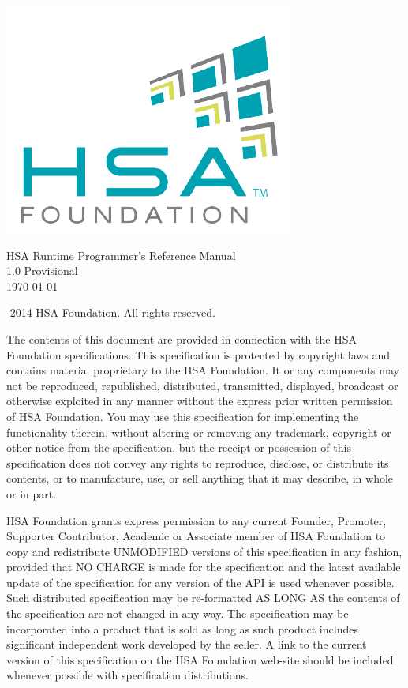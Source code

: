 \documentclass[final]{book}
\newcommand{\doctitle}{HSA Runtime Programmer's Reference Manual}
\newcommand{\docversion}{1.0 Provisional}
\begin{document}

\begin{titlepage}
\includegraphics[width=.4\textwidth]{fig/foundation_small.png}
\vspace*{7cm}
\begin{center}
{\Large \doctitle\\[1ex]\large\docversion}\\
\vspace*{1cm}
\vspace*{0.5cm}
{\small \today}
\end{center}
\end{titlepage}
\thispagestyle{empty} {-2014 HSA Foundation. All rights
  reserved.}


The contents of this document are provided in connection with the HSA Foundation
specifications. This specification is protected by copyright laws and contains
material proprietary to the HSA Foundation. It or any components may not be
reproduced, republished, distributed, transmitted, displayed, broadcast or
otherwise exploited in any manner without the express prior written permission
of HSA Foundation. You may use this specification for implementing the
functionality therein, without altering or removing any trademark, copyright or
other notice from the specification, but the receipt or possession of this
specification does not convey any rights to reproduce, disclose, or distribute
its contents, or to manufacture, use, or sell anything that it may describe, in
whole or in part.

HSA Foundation grants express permission to any current Founder, Promoter,
Supporter Contributor, Academic or Associate member of HSA Foundation to copy
and redistribute UNMODIFIED versions of this specification in any fashion,
provided that NO CHARGE is made for the specification and the latest available
update of the specification for any version of the API is used whenever
possible. Such distributed specification may be re-formatted AS LONG AS the
contents of the specification are not changed in any way. The specification may
be incorporated into a product that is sold as long as such product includes
significant independent work developed by the seller. A link to the current
version of this specification on the HSA Foundation web-site should be included
whenever possible with specification distributions.
\end{document}
